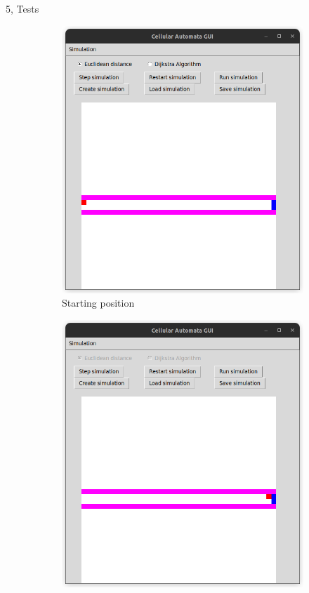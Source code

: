 \documentclass[10pt,a4paper]{article}
\begin{document}
\begin{task}{5, Tests}
\begin{figure}[H]
     \centering
     \begin{subfigure}[b]{0.3\textwidth}
         \centering
         \includegraphics[width=\textwidth]{images/task1_initial.png}
         \caption{Starting position}
         \label{fig:task1_initial}
     \end{subfigure}
     \begin{subfigure}[b]{0.3\textwidth}
         \centering
         \includegraphics[width=\textwidth]{images/task1_final.png}

\end{subfigure}
\end{figure}
\end{task}
\end{document}
